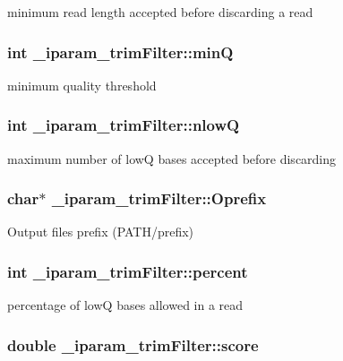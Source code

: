 minimum read length accepted before discarding a read \hypertarget{struct__iparam__trimFilter_a1e2b69f148d9299815af6ab7f575ad1a}{
\subsubsection[{min\+Q}]{\setlength{\rightskip}{0pt plus 5cm}int \+\_\+iparam\+\_\+trim\+Filter\+::min\+Q}}\label{struct__iparam__trimFilter_a1e2b69f148d9299815af6ab7f575ad1a}
minimum quality threshold \hypertarget{struct__iparam__trimFilter_aaeab85398303eada76cb6f32841fa094}{
\subsubsection[{nlow\+Q}]{\setlength{\rightskip}{0pt plus 5cm}int \+\_\+iparam\+\_\+trim\+Filter\+::nlow\+Q}}\label{struct__iparam__trimFilter_aaeab85398303eada76cb6f32841fa094}
maximum number of low\+Q bases accepted before discarding \hypertarget{struct__iparam__trimFilter_ad24f2902b532a4ff2dfb1122941064b8}{
\subsubsection[{Oprefix}]{\setlength{\rightskip}{0pt plus 5cm}char$\ast$ \+\_\+iparam\+\_\+trim\+Filter\+::\+Oprefix}}\label{struct__iparam__trimFilter_ad24f2902b532a4ff2dfb1122941064b8}
Output files prefix (P\+A\+T\+H/prefix) \hypertarget{struct__iparam__trimFilter_a8ed026b1de4fccc7288258c3a8faa395}{
\subsubsection[{percent}]{\setlength{\rightskip}{0pt plus 5cm}int \+\_\+iparam\+\_\+trim\+Filter\+::percent}}\label{struct__iparam__trimFilter_a8ed026b1de4fccc7288258c3a8faa395}
percentage of low\+Q bases allowed in a read \hypertarget{struct__iparam__trimFilter_a193ef2030f6eb8db0b75afbbd152d6a1}{
\subsubsection[{score}]{\setlength{\rightskip}{0pt plus 5cm}double \+\_\+iparam\+\_\+trim\+Filter\+::score}}\label{struct__iparam__trimFilter_a193ef2030f6eb8db0b75afbbd152d6a1}
